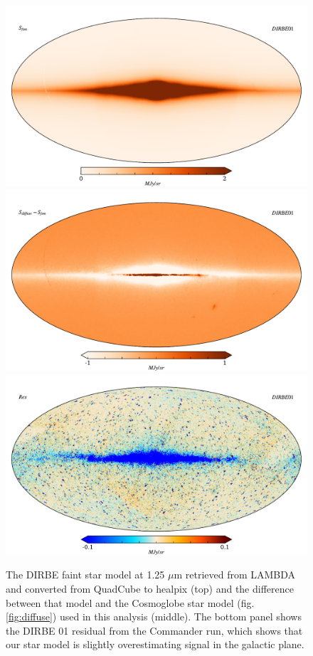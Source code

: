 \documentclass{aa}
\begin{document}
\begin{figure}
  \includegraphics[width=\columnwidth]{figs/diffuseTemplate/dirbe_template.pdf}\\
  \includegraphics[width=\columnwidth]{figs/diffuseTemplate/diffuse_diff.pdf}\\
  \includegraphics[width=\columnwidth]{figs/diffuseTemplate/band01_res.pdf}\\
  \caption{The DIRBE faint star model at 1.25 $\mu$m retrieved from LAMBDA and converted from QuadCube to healpix (top) and the difference between that model and the Cosmoglobe star model (fig. \ref{fig:diffuse}) used in this analysis (middle). The bottom panel shows the DIRBE 01 residual from the Commander run, which shows that our star model is slightly overestimating signal in the galactic plane.}
  \label{fig:DIRBEfaint}
\end{figure}
\end{document}
